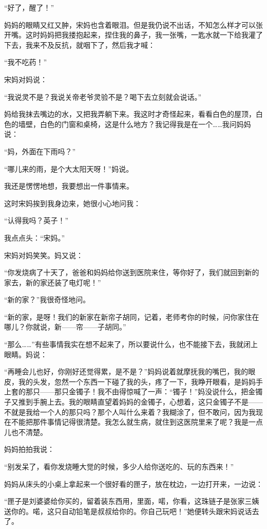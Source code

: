 \par “好了，醒了！”
\par 妈妈的眼睛又红又肿，宋妈也含着眼泪。但是我仍说不出话，不知怎么样才可以张开嘴。这时妈妈把我搂抱起来，捏住我的鼻子，我一张嘴，一匙水就一下给我灌了下去，我来不及反抗，就咽下了，然后我才喊：
\par “我不吃药！”
\par 宋妈对妈说：
\par “我说灵不是？我说关帝老爷灵验不是？喝下去立刻就会说话。”
\par 妈给我抹去嘴边的水，又把我弄躺下来。我这时才奇怪起来，看看白色的屋顶，白色的墙壁，白色的门窗和桌椅，这是什么地方？我记得我是在一个……我问妈妈说：
\par “妈，外面在下雨吗？”
\par “哪儿来的雨，是个大太阳天呀！”妈说。
\par 我还是愣愣地想，我要想出一件事情来。
\par 这时宋妈挨到我身边来，她很小心地问我：
\par “认得我吗？英子！”
\par 我点点头：“宋妈。”
\par 宋妈对妈笑笑。妈又说：
\par “你发烧病了十天了，爸爸和妈妈给你送到医院来住，等你好了，我们就回到新的家去，新的家还装了电灯呢！”
\par “新的家？”我很奇怪地问。
\par “新的家，是呀！我们的新家在新帘子胡同，记着，老师考你的时候，问你家住在哪儿？你就说，新——帘——子胡同。”
\par “那么……”有些事情我实在想不起来了，所以要说什么，也不能接下去，我就闭上眼睛。妈说：
\par “再睡会儿也好，你刚好还觉得累，是不是？”妈妈说着就摩抚我的嘴巴，我的眼皮，我的头发，忽然一个东西一下碰了我的头，疼了一下，我睁开眼看，是妈妈手上套的那只——那只金镯子！我不由得惊喊了一声：“镯子！”妈没说什么，把金镯子又推到手腕上去。我的眼睛直望着妈妈的金镯子，心想着，这只金镯子不是——不就是我给一个人的那只吗？那个人叫什么来着？我糊涂了，但不敢问，因为我现在不能把那件事情记得很清楚。我怎么就生病，就住到这医院里来了呢？我是一点儿也不清楚。
\par 妈妈拍拍我说：
\par “别发呆了，看你发烧睡大觉的时候，多少人给你送吃的、玩的东西来！”
\par 妈妈从床头的小桌上拿起来一个很好看的匣子，放在枕边，一边打开来，一边说：
\par “匣子是刘婆婆给你买的，留着装东西用，里面，喏，你看，这珠链子是张家三姨送你的。喏，这只自动铅笔是叔叔给你的。你自己玩吧！”她便转头跟宋妈说话去了。
